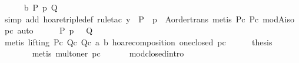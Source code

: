 \begin{isabellebody}
\ \ \ \ \isamarkupfalse%
\ b{}\ {}{}P{}{}\ p\ {}Q{}{}\isanewline
\ \ \ \ \ \ \isamarkupfalse%
\ {}simp\ add{}\ hoare{}triple{}def{}\ rule{}tac\ y\ {}\ {}P\ {}\ p{}\ \ A{}order{}trans{}\ {}metis\ P{}c\ Pc\ mod{}A{}iso\ pc{}\ auto{}\isanewline
\ \ \ \ \isamarkupfalse%
\ {}{}P{}{}\ p\ {}\ {}\ {}Q{}{}{}\isanewline
\ \ \ \ \ \ \isamarkupfalse%
\ {}metis\ {}lifting{}\ P{}c\ Q{}c\ Qc\ a\ b\ hoare{}composition\ one{}closed\ pc{}\isanewline
\ \ \ \ \isamarkupfalse%
\ {}thesis\isanewline
\ \ \ \ \ \ \isamarkupfalse%
\ {}metis\ mult{}oner\ pc{}\isanewline
\ \ \isamarkupfalse%
%
\endisatagproof
{\isafoldproof}%
%
\isadelimproof
\isanewline
%
\endisadelimproof
\isanewline
\ \ \isamarkupfalse%
\ mod{}closed{}intro{}\isanewline

\end{isabellebody}
